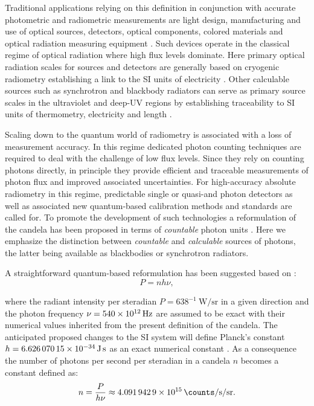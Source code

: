 		Traditional applications relying on this definition in conjunction with accurate photometric and radiometric measurements are light design, manufacturing and use of optical sources, detectors, optical components, colored materials and optical radiation measuring equipment \cite{zwinkels2010photometry}.
		Such devices operate in the classical regime of optical radiation where high flux levels dominate. Here primary optical radiation scales for sources and detectors are generally based on cryogenic radiometry establishing a link to the SI units of electricity \cite{fox20052}. Other calculable sources such as synchrotron and blackbody radiators can serve as primary source scales in the ultraviolet and deep-UV regions by establishing traceability to SI units of thermometry, electricity and length \cite{zwinkels2010photometry, Cheung2007}.

		Scaling down to the quantum world of radiometry is associated with a loss of measurement accuracy. In this regime dedicated photon counting techniques are required to deal with the challenge of low flux levels. Since they rely on counting photons directly, in principle they provide efficient and traceable measurements of photon flux and improved associated uncertainties. For high-accuracy absolute radiometry in this regime, predictable single or quasi-\spss and photon detectors as well as associated new quantum-based calibration methods and standards are called for. To promote the development of such technologies a reformulation of the candela has been proposed in terms of \emph{countable} photon units \cite{zwinkels2010photometry, Cheung2007, SIHighlights2017, QuCandelaProject}. Here we emphasize the distinction between \emph{countable} and \emph{calculable} sources of photons, the latter being available as blackbodies or synchrotron radiators.

		A straightforward quantum-based reformulation has been suggested based on \cite{Cheung2007, zwinkels2010photometry}:
% 
		\begin{equation}
			P = n h \nu,
		\end{equation}

		where the radiant intensity per steradian $P = 638^{-1} \SI{}{\watt\per\steradian}$ in a given direction and the photon frequency $\nu = \SI{540d12}{\hertz}$ are assumed to be exact with their numerical values inherited from the present definition of the candela. The anticipated proposed changes to the SI system will define Planck's constant $h = \SI{6.62607015d-34}{\joule\second}$ as an exact numerical constant \cite{SIproposal}. As a consequence the number of photons per second per steradian in a candela $n$ becomes a constant defined as:
% 
		\begin{equation}
			n = \frac{P}{h \nu} \approx \SI{4.0919429d15}{\counts\per\second\per\steradian}.
		\end{equation}

